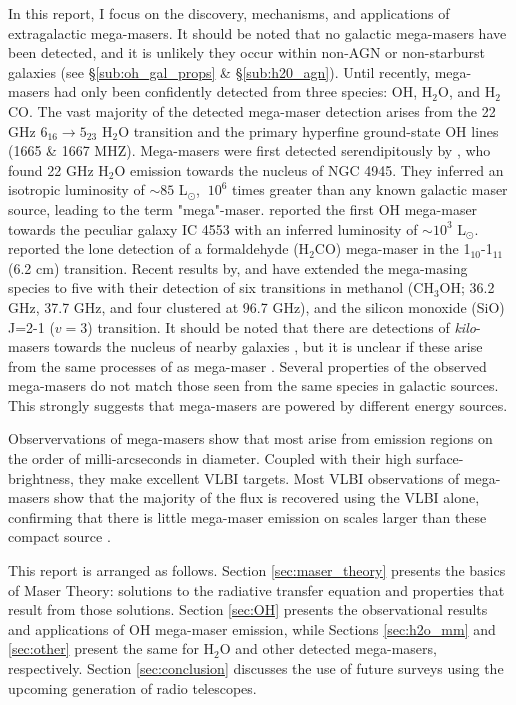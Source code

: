 In this report, I focus on the discovery, mechanisms, and applications of extragalactic mega-masers. It should be noted that no galactic mega-masers have been detected, and it is unlikely they occur within non-AGN or non-starburst galaxies (see \S\ref{sub:oh_gal_props} \& \S\ref{sub:h20_agn}). Until recently, mega-masers had only been confidently detected from three species: OH, H$_2$O, and H$_2$CO. The vast majority of the detected mega-maser detection arises from the 22 GHz $6_{16} \longrightarrow 5_{23}$ H$_2$O transition and the primary hyperfine ground-state OH lines (1665 \& 1667 MHZ). Mega-masers were first detected serendipitously by \citet{DOS_SANTOS_1979}, who found 22 GHz H$_2$O emission towards the nucleus of NGC 4945. They inferred an isotropic luminosity of $\sim 85$ L$_{\odot}$, $~10^6$ times greater than any known galactic maser source, leading to the term "mega"-maser. \citet{Baan_1982} reported the first OH mega-maser towards the peculiar galaxy IC 4553 with an inferred luminosity of $\sim10^3$ L$_{\odot}$. \citet{baan1986} reported the lone detection of a formaldehyde (H$_2$CO) mega-maser in the 1$_{10}$-1$_{11}$ (6.2 cm) transition. Recent results by, \citet{wang2014_SiO_CH3OH} and \citet{chen_methanol_2015} have extended the mega-masing species to five with their detection of six transitions in methanol (CH$_3$OH; 36.2 GHz, 37.7 GHz, and four clustered at 96.7 GHz), and the silicon monoxide (SiO) J=2-1  ($v=3$) transition. It should be noted that there are detections of {\it kilo}-masers towards the nucleus of nearby galaxies \citep[e.g.,]{Ho_1987}, but it is unclear if these arise from the same processes of as mega-maser \citep{lo2005}. Several properties of the observed mega-masers do not match those seen from the same species in galactic sources. This strongly suggests that mega-masers are powered by different energy sources.

Observervations of mega-masers show that most arise from emission regions on the order of milli-arcseconds in diameter. Coupled with their high surface-brightness, they make excellent VLBI targets. Most VLBI observations of mega-masers show that the majority of the flux is recovered using the VLBI alone, confirming that there is little mega-maser emission on scales larger than these compact source \citep{lo2005}.

This report is arranged as follows. Section \ref{sec:maser_theory} presents the basics of Maser Theory: solutions to the radiative transfer equation and properties that result from those solutions. Section \ref{sec:OH} presents the observational results and applications of OH mega-maser emission, while Sections \ref{sec:h2o_mm} and \ref{sec:other} present the same for H$_2$O and other detected mega-masers, respectively. Section \ref{sec:conclusion} discusses the use of future surveys using the upcoming generation of radio telescopes.
